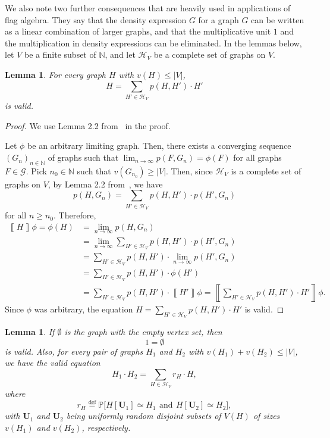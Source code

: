 \documentclass{article}
\newtheorem{lem}[thm]{Lemma}
\newcommand*{\emptygraph}{\emptyset}
\newcommand*{\defeq}{\stackrel{\mathrm{def}}{=}}
\newcommand*{\db}[1]{\left\llbracket #1 \right\rrbracket}
\begin{document}
We also note two further consequences that are heavily used in applications of flag algebra.
They say that the density expression $G$ for a graph $G$ can be written as a linear combination of larger graphs, and that the multiplicative unit $1$ and the multiplication in density expressions can be eliminated.
In the lemmas below, let $V$ be a finite subset of $\mathbb{N}$, and let $\mathcal{H}_V$ be a complete set of graphs on $V$.
\begin{lem}
  \label{lemma:decomposition}
  For every graph $H$ with $v(H) \leq |V|$,
  \[
  H = \sum_{H' \in \mathcal{H}_V} p(H,H') \cdot H'
  \]
  is valid.
\end{lem}
\begin{proof}
  We use Lemma 2.2 from~\cite{Razborov2007} in the proof. 

  Let $\phi$ be an arbitrary limiting graph. Then, there exists 
  a converging sequence $(G_n)_{n \in \mathbb{N}}$ of graphs such that 
  $\lim_{n \to \infty} p(F,G_n) = \phi(F)$ for all graphs $F \in \mathcal{G}$. Pick $n_0 \in \mathbb{N}$ such that $v(G_{n_0}) \geq |V|$. Then, since $\mathcal{H}_V$ is a complete set of graphs on $V$, 
  by Lemma 2.2 from~\cite{Razborov2007}, we have
  \[
  p(H,G_n) = \sum_{H' \in \mathcal{H}_V} p(H,H') \cdot p(H',G_n)
  \]
  for all $n \geq n_0$. Therefore,
  \begin{align*}
  \db{H}\phi = \phi(H) & = \lim_{n \to \infty} p(H,G_n)
  \\
  & = \lim_{n \to \infty} \sum_{H' \in \mathcal{H}_V} p(H,H') \cdot p(H',G_n)
  \\
  & = \sum_{H' \in \mathcal{H}_V} p(H,H') \cdot \lim_{n \to \infty} p(H',G_n)
  \\
  & = \sum_{H' \in \mathcal{H}_V} p(H,H') \cdot \phi(H')
  \\
  & = \sum_{H' \in \mathcal{H}_V} p(H,H') \cdot \db{H'}\phi
  = \db{\sum_{H' \in \mathcal{H}_V} p(H,H') \cdot H'}\phi.
  \end{align*}
  Since $\phi$ was arbitrary, the equation
  $H = \sum_{H' \in \mathcal{H}_V} p(H,H') \cdot H'$
  is valid.
\end{proof}
\begin{lem}
  \label{lemma:eliminate-multiplication}
  If $\emptygraph$ is the graph with the empty vertex set, then
  \[
  1 = \emptygraph
  \]
  is valid. Also, for every pair of graphs $H_1$ and $H_2$ with $v(H_1) + v(H_2) \leq |V|$, we have the valid equation
  \[
  H_1 \cdot H_2 = \sum_{H \in \mathcal{H}_V} r_H \cdot H,
  \]
  where
  \[
  r_H \defeq \mathbb{P}\big[H[\mathbf{U}_1] \simeq H_1\ \, \mathrm{and}\ \, H[\mathbf{U}_2] \simeq H_2\big],
  \]
  with $\mathbf{U}_1$ and $\mathbf{U}_2$ being uniformly random disjoint subsets of $V(H)$ of sizes $v(H_1)$ and $v(H_2)$, respectively.
\end{lem}
\end{document}
